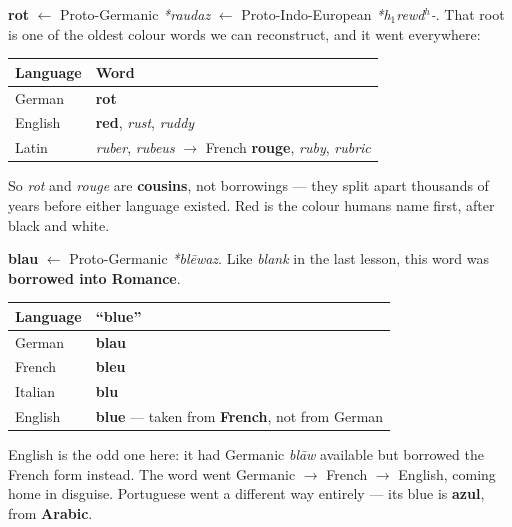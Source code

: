 \begin{cousinweb}
\textbf{rot} $\leftarrow$ Proto-Germanic \emph{*raudaz} $\leftarrow$
Proto-Indo-European \emph{*h\ensuremath{_1}rewd\ensuremath{^h}-}. That root is
one of the oldest colour words we can reconstruct, and it went everywhere:
\end{cousinweb}

\begin{center}
\begin{tabular}{@{}ll@{}}
\toprule
Language & Word \\
\midrule
German & \textbf{rot} \\
English & \textbf{red}, \emph{rust}, \emph{ruddy} \\
Latin & \emph{ruber}, \emph{rubeus} $\to$ French \textbf{rouge}, \emph{ruby},
\emph{rubric} \\
\bottomrule
\end{tabular}
\end{center}

So \emph{rot} and \emph{rouge} are \textbf{cousins}, not borrowings --- they
split apart thousands of years before either language existed. Red is the colour
humans name first, after black and white.

\begin{cousinweb}
\textbf{blau} $\leftarrow$ Proto-Germanic \emph{*bl\=ewaz}. Like \emph{blank} in
the last lesson, this word was \textbf{borrowed into Romance}.
\end{cousinweb}

\begin{center}
\begin{tabular}{@{}ll@{}}
\toprule
Language & ``blue'' \\
\midrule
German & \textbf{blau} \\
French & \textbf{bleu} \\
Italian & \textbf{blu} \\
English & \textbf{blue} --- taken from \textbf{French}, not from German \\
\bottomrule
\end{tabular}
\end{center}

\begin{culture}
English is the odd one here: it had Germanic \emph{bl\=aw} available but
borrowed the French form instead. The word went Germanic $\to$ French $\to$
English, coming home in disguise. Portuguese went a different way entirely ---
its blue is \textbf{azul}, from \textbf{Arabic}.
\end{culture}


